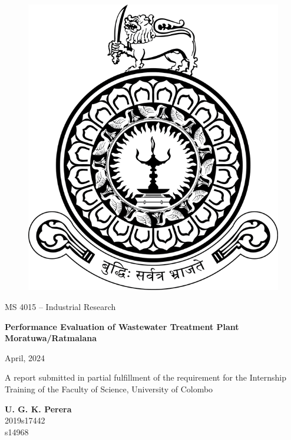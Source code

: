 \begin{titlepage}
\begin{figure}[H]
\centering
\includegraphics[width=0.5\linewidth]{logo.png}
\end{figure}


   \begin{center}
       \vspace*{1cm}

       MS 4015 – Industrial Research

       \vspace{0.5cm}
        {\fontsize{20}{24}\selectfont \textbf{Performance Evaluation of Wastewater Treatment Plant Moratuwa/Ratmalana}}
            
       \vspace{1.5cm}

       April, 2024

       \vfill
            
      A report submitted in partial fulfillment of the requirement for the Internship \\
       Training of the Faculty of Science, University of Colombo
            
       \vspace{0.8cm}
            
       \textbf{U. G. K. Perera}\\
       2019s17442\\
       s14968\\
       
            
   \end{center}
\end{titlepage}
